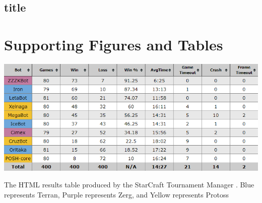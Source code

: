 \documentclass[journal]{IEEEtran}
\begin{document}
	\subsection{title}
	\section{Supporting Figures and Tables}
\begin{table}[]
		\centering
		\includegraphics[width=\textwidth]{STMResultsWithBot}
		\caption{The HTML results table produced by the StarCraft Tournament Manager \cite{Tournament}. Blue represents Terran, Purple represents Zerg, and Yellow represents Protoss}
		\label{Table2}
	\end{table}
\end{document}
